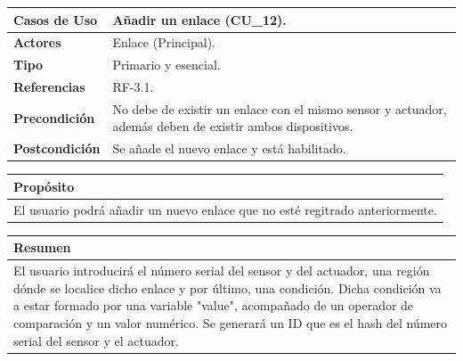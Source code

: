 \begin{itemize}
    \begin{table}[h!]
        \centering
        \begin{tabular}{|l|p{}|}
            \hline
            \textbf{Casos de Uso}   &   Añadir un enlace (CU\_12). \\
            \hline 
            \textbf{Actores}        &   Enlace (Principal). \\ 
            \hline 
            \textbf{Tipo}           &   Primario y esencial. \\ 
            \hline
            \textbf{Referencias}    &   RF-3.1. \\ 
            \hline
            \textbf{Precondición}   &   No debe de existir un enlace con el mismo sensor y actuador, además deben
            de existir ambos dispositivos. \\ 
            \hline
            \textbf{Postcondición}  &   Se añade el nuevo enlace y está habilitado. \\ 
            \hline
        \end{tabular}
        
        \vspace{5mm}
        
        \begin{tabular}{|p{\textwidth}|}
            \hline
            \rowcolor{SeaGreen} \textbf{Propósito} \\
            \hline
            \multicolumn{1}{|p{12cm}|}{El usuario podrá añadir un nuevo enlace que no esté regitrado anteriormente.} \\ [0.5ex]
            \hline
        \end{tabular}
        
        \vspace{5mm}
        
        \begin{tabular}{|p{\textwidth}|}
            \hline
            \rowcolor{SeaGreen} \textbf{Resumen} \\
            \hline
            \multicolumn{1}{|p{12cm}|}{El usuario introducirá el número serial del sensor y del actuador, una región 
            dónde se localice dicho enlace y por último, una condición. Dicha condición va a estar formado por una 
            variable "value", acompañado de un operador de comparación y un valor numérico. Se generará un ID que es 
            el hash del número serial del sensor y el actuador.} \\ [0.5ex]
            \hline
        \end{tabular}
        

\end{table}
\end{itemize}
